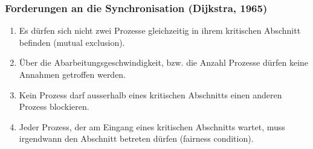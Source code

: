 \subsubsection{Forderungen an die Synchronisation (Dijkstra, 1965)}
\begin{enumerate}
  \item Es dürfen sich nicht zwei Prozesse gleichzeitig in ihrem kritischen Abschnitt befinden (mutual exclusion).
  \item Über die Abarbeitungsgeschwindigkeit, bzw. die Anzahl Prozesse dürfen keine Annahmen getroffen werden.
  \item Kein Prozess darf ausserhalb eines kritischen Abschnitts einen anderen Prozess blockieren.
  \item Jeder Prozess, der am Eingang eines kritischen Abschnitts wartet, muss irgendwann den Abschnitt betreten dürfen (fairness condition).
\end{enumerate}

